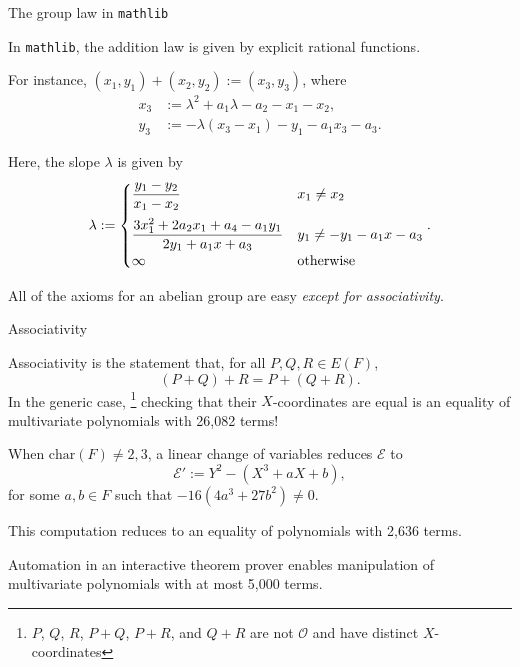\documentclass[10pt]{beamer}
\begin{document}
\begin{frame}[t]{The group law in \texttt{mathlib}}

In \texttt{mathlib}, the addition law is given by explicit rational functions.

\vspace{0.5cm} For instance, $ (x_1, y_1) + (x_2, y_2) := (x_3, y_3) $, where
\begin{align*}
x_3 & := \lambda^2 + a_1\lambda - a_2 - x_1 - x_2, \\
y_3 & := -\lambda(x_3 - x_1) - y_1 - a_1x_3 - a_3.
\end{align*}

\pause

Here, the slope $ \lambda $ is given by
$$ \lambda := \begin{cases} \dfrac{y_1 - y_2}{x_1 - x_2} & x_1 \ne x_2 \vspace{0.2cm} \\ \dfrac{3x_1^2 + 2a_2x_1 + a_4 - a_1y_1}{2y_1 + a_1x + a_3} & y_1 \ne -y_1 - a_1x - a_3 \\ \infty & \text{otherwise} \end{cases}. $$

\pause

All of the axioms for an abelian group are easy \emph{except for associativity}.

\end{frame}

\begin{frame}[t]{Associativity}

Associativity is the statement that, for all $ P, Q, R \in E(F) $,
$$ (P + Q) + R = P + (Q + R). $$
In the generic case, \footnote{$ P $, $ Q $, $ R $, $ P + Q $, $ P + R $, and $ Q + R $ are not $ \mathcal{O} $ and have distinct $ X $-coordinates} checking that their $ X $-coordinates are equal is an equality of multivariate polynomials with 26,082 terms!

\pause

\vspace{0.5cm} When $ \mathrm{char}(F) \ne 2, 3 $, a linear change of variables reduces $ \mathcal{E} $ to
$$ \mathcal{E}' := Y^2 - (X^3 + aX + b), $$
for some $ a, b \in F $ such that $ -16(4a^3 + 27b^2) \ne 0 $.

\pause

\vspace{0.5cm} This computation reduces to an equality of polynomials with 2,636 terms.

\pause

\vspace{0.5cm} Automation in an interactive theorem prover enables manipulation of multivariate polynomials with at most 5,000 terms.

\end{frame}
\end{document}
